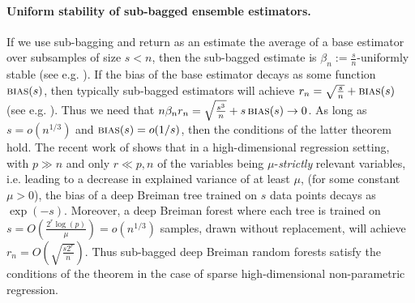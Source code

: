\paragraph{Uniform stability of sub-bagged ensemble estimators.} If we use sub-bagging and return as an estimate the average of a base estimator over subsamples of size $s<n$, then the sub-bagged estimate is $\beta_n:=\frac{s}{n}$-uniformly stable (see e.g. \cite{elisseeff2003leave}). If the bias of the base estimator decays as some function $\textsc{bias}(s)$, then typically sub-bagged estimators will achieve $r_n = \sqrt{\frac{s}{n}} + \textsc{bias}(s)$ (see e.g. \cite{Athey2016,Khosravi2019,Syrgkanis2020}). Thus we need that $n\beta_n r_n = \sqrt{\frac{s^3}{n}} + s\, \textsc{bias}(s) \to 0$. As long as $s=o(n^{1/3})$ and $\textsc{bias}(s)=o(1/s)$, then the conditions of the latter theorem hold. The recent work of \cite{Syrgkanis2020} shows that in a high-dimensional regression setting, with $p\gg n$ and only $r\ll p,n$ of the variables being $\mu$-\emph{strictly} relevant variables, i.e. leading to a decrease in explained variance of at least $\mu$, (for some constant $\mu>0$), the bias of a deep Breiman tree trained on $s$ data points decays as $\exp(-s)$. Moreover, a deep Breiman forest where each tree is trained on $s=O\left(\frac{2^r \log(p)}{\mu}\right)=o(n^{1/3})$ samples, drawn without replacement, will achieve $r_n = O\left(\sqrt{\frac{s 2^r}{n}}\right)$. Thus sub-bagged deep Breiman random forests satisfy the conditions of the theorem in the case of sparse high-dimensional non-parametric regression.

